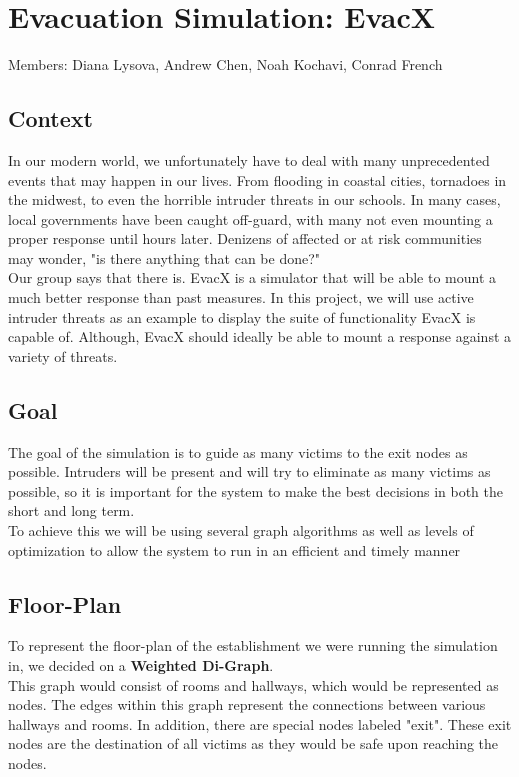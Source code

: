 \documentclass[12pt]{article}
\begin{document}
\section*{\huge Evacuation Simulation: EvacX}
Members: Diana Lysova, Andrew Chen, Noah Kochavi, Conrad French 
\subsection*{Context} 
\hspace*{6mm} In our modern world, we unfortunately have to deal with many unprecedented events that may happen in our lives. From flooding in coastal cities, tornadoes in the midwest, to even the horrible intruder threats in our schools. In many cases, local governments have been caught off-guard, with many not even mounting a proper response until hours later. Denizens of affected or at risk communities may wonder, "is there anything that can be done?" \\[5pt]
\hspace*{6mm} Our group says that there is. EvacX is a simulator that will be able to mount a much better response than past measures. In this project, we will use active intruder threats as an example to display the suite of functionality EvacX is capable of. Although, EvacX should ideally be able to mount a response against a variety of threats.
\subsection*{Goal}
\hspace*{6mm} The goal of the simulation is to guide as many victims to the exit nodes as possible. Intruders will be present and will try to eliminate as many victims as possible, so it is important for the system to make the best decisions in both the short and long term.\\[5pt]
\hspace*{6mm} To achieve this we will be using several graph algorithms as well as levels of optimization to allow the system to run in an efficient and timely manner
\subsection*{Floor-Plan}
\hspace*{6mm} To represent the floor-plan of the establishment we were running the simulation in, we decided on a \textbf{Weighted Di-Graph}. \\[5pt]
\hspace*{6mm} This graph would consist of rooms and hallways, which would be represented as nodes. The edges within this graph represent the connections between various hallways and rooms. In addition, there are special nodes labeled "exit". These exit nodes are the destination of all victims as they would be safe upon reaching the nodes.
\end{document}
